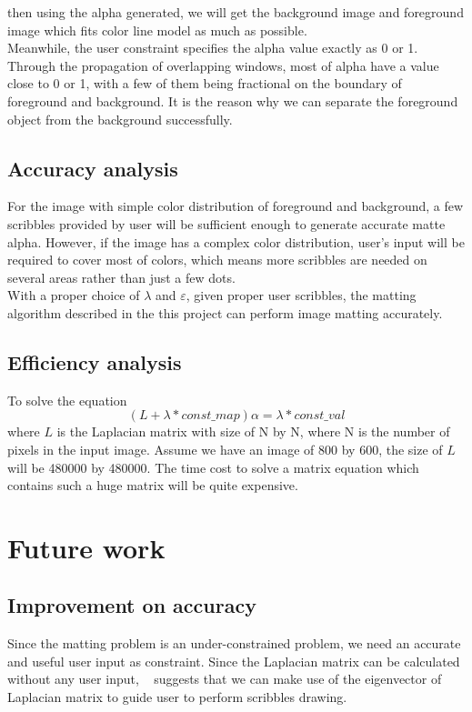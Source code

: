 \documentclass[11pt,letterpaper]{article}
\begin{document}
then using the alpha generated, we will get the background image and foreground image which fits color line model as much as possible. \\

Meanwhile, the user constraint specifies the alpha value exactly as 0 or 1. Through the propagation of overlapping windows, most of alpha have a value close to 0 or 1, with a few of them being fractional on the boundary of foreground and background. It is the reason why we can separate the foreground object from the background successfully. \\

\subsection{Accuracy analysis}
For the image with simple color distribution of foreground and background, a few scribbles provided by user will be sufficient enough to generate accurate matte alpha. However, if the image has a complex color distribution, user's input will be required to cover most of colors, which means more scribbles are needed on several areas rather than just a few dots. \\

With a proper choice of $\lambda$ and $\varepsilon$, given proper user scribbles, the matting algorithm described in the this project can perform image matting accurately. \\

\subsection{Efficiency analysis}
To solve the equation
$$(L + \lambda * const\_map)\alpha = \lambda * const\_val$$
where $L$ is the Laplacian matrix with size of N by N, where N is the number of pixels in the input image. Assume we have an image of 800 by 600, the size of $L$ will be 480000 by 480000. The time cost to solve a matrix equation which contains such a huge matrix will be quite expensive. \\

\section{Future work}

\subsection{Improvement on accuracy}
Since the matting problem is an under-constrained problem, we need an accurate and useful user input as constraint. Since the Laplacian matrix can be calculated without any user input, ~\cite{Levin:2006} suggests that we can make use of the eigenvector of Laplacian matrix to guide user to perform scribbles drawing. \\
\end{document}
